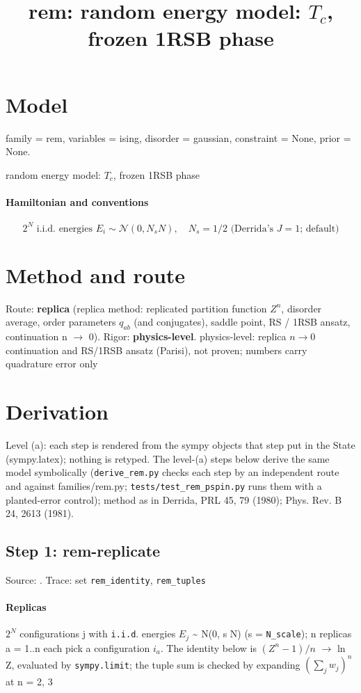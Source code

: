 \documentclass[11pt]{article}
\title{rem: random energy model: $T_{c}$, frozen 1RSB phase}
\date{}
\begin{document}
\maketitle
\section{Model}
family = rem, variables = ising, disorder = gaussian, constraint = None, prior = None.

random energy model: $T_{c}$, frozen 1RSB phase \cite{b1,b2}

\paragraph{Hamiltonian and conventions} \cite{b1,b2}
\begin{equation}
2^N \text{ i.i.d. energies } E_i \sim \mathcal{N}(0, N_s N),\quad N_s = 1/2 \text{ (Derrida's } J = 1\text{; default)}
\end{equation}
\section{Method and route}
Route: \textbf{replica} (replica method: replicated partition function $Z^{n}$, disorder average, order parameters $q_{ab}$ (and conjugates), saddle point, RS / 1RSB ansatz, continuation n $\to$ 0). Rigor: \textbf{physics-level}. physics-level: replica $n \to 0$ continuation and RS/1RSB ansatz (Parisi), not proven; numbers carry quadrature error only
\section{Derivation}
Level (a): each step is rendered from the sympy objects that step put in the State (sympy.latex); nothing is retyped.
The level-(a) steps below derive the same model symbolically (\texttt{derive\_rem.py} checks each step by an independent route and against families/rem.py; \texttt{tests/test\_rem\_pspin.py} runs them with a planted-error control); method as in Derrida, PRL 45, 79 (1980); Phys. Rev. B 24, 2613 (1981).
\subsection{Step 1: rem-replicate}
Source: \cite{b3,b4}. Trace: set \texttt{rem\_identity}, \texttt{rem\_tuples}

\paragraph{Replicas}
$2^{N}$ configurations j with \texttt{i.i.d}. energies $E_{j}$ \~{} N(0, s N) (s = \texttt{N\_scale}); n replicas a = 1..n each pick a configuration $i_{a}$.  The identity below is $(Z^{n} - 1)/n$ $\to$ ln Z, evaluated by \texttt{sympy.limit}; the tuple sum is checked by expanding $(\sum _{j} w_{j})^{n}$ at n = 2, 3
\end{document}
